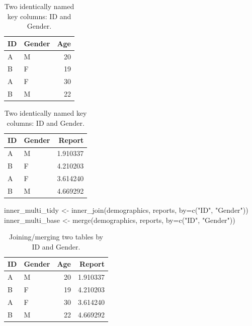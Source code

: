 \documentclass[
]{book}
\newenvironment{Shaded}{\begin{snugshade}}{\end{snugshade}}
\newcommand{\AttributeTok}[1]{\textcolor[rgb]{0.77,0.63,0.00}{#1}}
\newcommand{\FunctionTok}[1]{\textcolor[rgb]{0.00,0.00,0.00}{#1}}
\newcommand{\NormalTok}[1]{#1}
\newcommand{\OtherTok}[1]{\textcolor[rgb]{0.56,0.35,0.01}{#1}}
\newcommand{\StringTok}[1]{\textcolor[rgb]{0.31,0.60,0.02}{#1}}
\begin{document}
\begin{table}
\caption{\label{tab:unnamed-chunk-189}Two identically named key columns: ID and Gender.}

\centering
\begin{tabular}[t]{l|l|r}
\hline
ID & Gender & Age\\
\hline
A & M & 20\\
\hline
B & F & 19\\
\hline
A & F & 30\\
\hline
B & M & 22\\
\hline
\end{tabular}
\centering
\begin{tabular}[t]{l|l|r}
\hline
ID & Gender & Report\\
\hline
A & M & 1.910337\\
\hline
B & F & 4.210203\\
\hline
A & F & 3.614240\\
\hline
B & M & 4.669292\\
\hline
\end{tabular}
\end{table}

\begin{Shaded}
\begin{Highlighting}[]
\NormalTok{inner\_multi\_tidy }\OtherTok{\textless{}{-}} \FunctionTok{inner\_join}\NormalTok{(demographics, reports, }\AttributeTok{by=}\FunctionTok{c}\NormalTok{(}\StringTok{"ID"}\NormalTok{, }\StringTok{"Gender"}\NormalTok{))}
\NormalTok{inner\_multi\_base }\OtherTok{\textless{}{-}} \FunctionTok{merge}\NormalTok{(demographics, reports, }\AttributeTok{by=}\FunctionTok{c}\NormalTok{(}\StringTok{"ID"}\NormalTok{, }\StringTok{"Gender"}\NormalTok{))}
\end{Highlighting}
\end{Shaded}

\begin{table}

\caption{\label{tab:unnamed-chunk-191}Joining/merging two tables by ID and Gender.}
\centering
\begin{tabular}[t]{l|l|r|r}
\hline
ID & Gender & Age & Report\\
\hline
A & M & 20 & 1.910337\\
\hline
B & F & 19 & 4.210203\\
\hline
A & F & 30 & 3.614240\\
\hline
B & M & 22 & 4.669292\\
\hline
\end{tabular}
\end{table}
\end{document}
